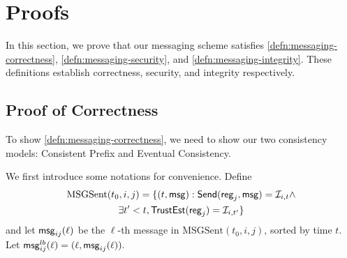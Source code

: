 \newcommand{\MSGS}{\text{MSGSent}}
\newcommand{\msgs}{\text{msgsent}}
\newcommand{\MSGR}{\text{MSGRecv}}
\newcommand{\cD}{\mathcal{D}}

\section{Proofs}
\label{sec:proofs}
In this section, we prove that our messaging scheme satisfies \cref{defn:messaging-correctness}, \cref{defn:messaging-security}, and \cref{defn:messaging-integrity}. These definitions establish correctness, security, and integrity respectively.
\subsection{Proof of Correctness}
To show \cref{defn:messaging-correctness}, we need to show our two consistency models: Consistent Prefix and Eventual Consistency.

We first introduce some notations for convenience. Define
\begin{multline*}
    \MSGS(t_0, i, j) = \{(t, \msg): \send(\reg_j, \msg) = \cI_{i, t} \land \\
             \exists t' < t, \trust(\reg_j) = \cI_{i, t'}\}
\end{multline*}
and let $\mathsf{msg}_{ij}(\ell)$ be the $\ell$-th message in $\MSGS(t_0, i, j)$, sorted by time $t$. Let $\mathsf{msg}_{ij}^{lb}(\ell) = (\ell, \mathsf{msg}_{ij}(\ell)).$

